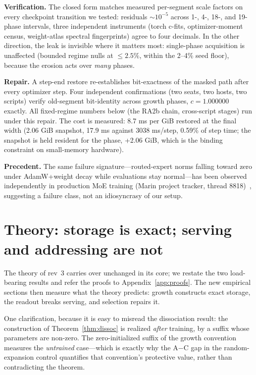 \documentclass[11pt]{article}
\theoremstyle{definition}\newtheorem{definition}{Definition}
\theoremstyle{remark}\newtheorem{remark}{Remark}
\begin{document}
\textbf{Verification.} The closed form matches measured per-segment scale factors on
every checkpoint transition we tested: residuals $\sim\!10^{-5}$ across 1-, 4-, 18-, and
19-phase intervals, three independent instruments (torch c-fits, optimizer-moment census,
weight-atlas spectral fingerprints) agree to four decimals. In the other direction, the leak
is invisible where it matters most: single-phase acquisition is unaffected (bounded regime
nulls at $\le 2.5\%$, within the 2--4\% seed floor), because the erosion acts over
\emph{many} phases.

\textbf{Repair.} A step-end restore re-establishes bit-exactness of the masked path after
every optimizer step. Four independent confirmations (two seats, two hosts, two scripts)
verify old-segment bit-identity across growth phases, $c=1.000000$ exactly. All fixed-regime
numbers below (the RA2b chain, cross-script stages) run under this repair. The cost is measured: 8.7 ms per GiB restored at the final width (2.06 GiB snapshot, 17.9 ms against 3038 ms/step, 0.59\% of step time; the snapshot is held resident for the phase, +2.06 GiB, which is the binding constraint on small-memory hardware).

\textbf{Precedent.} The same failure signature---routed-expert norms falling toward zero
under AdamW+weight decay while evaluations stay normal---has been observed independently in
production MoE training (Marin project tracker, thread 8818)~\cite{marin}, suggesting a failure class,
not an idiosyncrasy of our setup.

\section{Theory: storage is exact; serving and addressing are not}
\label{sec:theory}

The theory of rev~3 carries over unchanged in its core; we restate the two load-bearing
results and refer the proofs to Appendix~\ref{app:proofs}. The new empirical sections then
measure what the theory predicts: growth constructs exact storage, the readout breaks
serving, and selection repairs it.

One clarification, because it is easy to misread the dissociation result: the construction
of Theorem~\ref{thm:dissoc} is realized \emph{after} training, by a suffix whose parameters
are non-zero. The zero-initialized suffix of the growth convention measures the
\emph{untrained} case---which is exactly why the A$-$C gap in the random-expansion control
quantifies that convention's protective value, rather than contradicting the theorem.
\end{document}
